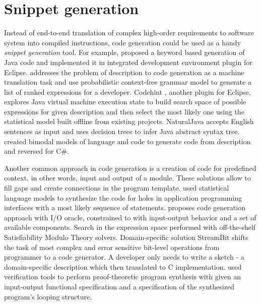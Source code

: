\section{Snippet generation}
Instead of end-to-end translation of complex high-order requirements to software system into compiled instructions, code generation could be used as a handy \emph{snippet generation} tool. For example, \cite{little2009keyword} proposed a keyword based generation of Java code and implemented it in integrated development environment plugin for Eclipse. \cite{Gvero2015} addresses the problem of description to code generation as a machine translation task and use probabilistic context-free grammar model to generate a list of ranked expressions for a developer. Codehint \parencite{Galenson2014}, another plugin for Eclipse, explores Java virtual machine execution state to build search space of possible expressions for given description and then select the most likely one using the statistical model built offline from existing projects. NaturalJava \parencite{Price2000} accepts English sentences as input and uses decision trees to infer Java abstract syntax tree. \cite{pmlr-v37-allamanis15} created bimodal models of language and code to generate code from description and reversed for C\#.

Another common approach in code generation is a creation of code for predefined context, in other words, input and output of a module. These solutions allow to fill gaps and create connections in the program template. \cite{Raychev2014} used statistical language models to synthesize the code for holes in application programming interfaces with a most likely sequence of statements. \cite{Jha2010} proposes code generation approach with I/O oracle, constrained to with input-output behavior and a set of available components. Search in the expression space performed with off-the-shelf Satisfiability Modulo Theory solvers. Domain-specific solution StreamBit \parencite{Solar-Lezama2005} shifts the task of most complex and error sensitive bit-level operations from programmer to a code generator. A developer only needs to write a sketch - a domain-specific description which then translated to C implementation. \cite{Srivastava2010} used verification tools to perform proof-theoretic program synthesis with given an input-output functional specification and a specification of the synthesized program’s looping structure.


